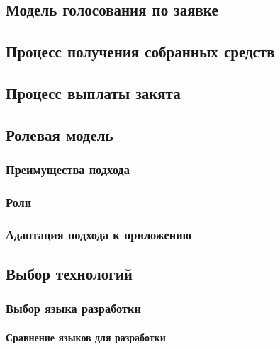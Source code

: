 \documentclass[a4paper,12pt,reqno]{article}
\begin{document}
\subsection{Модель голосования по заявке} \label{sec: vote}

\subsection{Процесс получения собранных средств}

\subsection{Процесс выплаты закята}



\subsection{Ролевая модель} \label{theory-rbac}

\subsubsection*{Преимущества подхода}


\subsubsection*{Роли}



\subsubsection*{Адаптация подхода к приложению}




\newpage

\setcounter{section}{3}
\setcounter{subsection}{0}
 \label{sec: 3}


\subsection{Выбор технологий} \label{sec: tech}


\subsubsection{Выбор языка разработки} \label{sec:lang}


\paragraph*{Сравнение языков для разработки\\}
\end{document}
